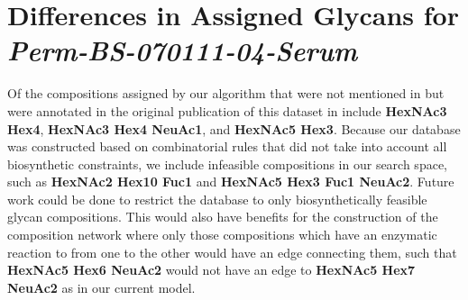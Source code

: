 \documentclass{article}
\newcommand{\rpserum}[0]{\textit{Perm-BS-070111-04-Serum}\xspace}
\begin{document}
\section{Differences in Assigned Glycans for \rpserum}

    Of the compositions assigned by our algorithm that were not
    mentioned in \cite{Yu2013} but were annotated in the original publication
    of this dataset in \cite{Hu2012} include \textbf{HexNAc3 Hex4},
    \textbf{HexNAc3 Hex4 NeuAc1}, and \textbf{HexNAc5 Hex3}. Because our database
    was constructed based on combinatorial rules that did not take into account
    all biosynthetic constraints, we include infeasible compositions in our search
    space, such as \textbf{HexNAc2 Hex10 Fuc1} and \textbf{HexNAc5 Hex3 Fuc1 NeuAc2}.
    Future work could be done to restrict the database to only biosynthetically
    feasible glycan compositions. This would also have benefits for the construction
    of the composition network where only those compositions which have an enzymatic
    reaction to from one to the other would have an edge connecting them, such that
    \textbf{HexNAc5 Hex6 NeuAc2} would not have an edge to \textbf{HexNAc5 Hex7 NeuAc2}
    as in our current model.



\end{document}
